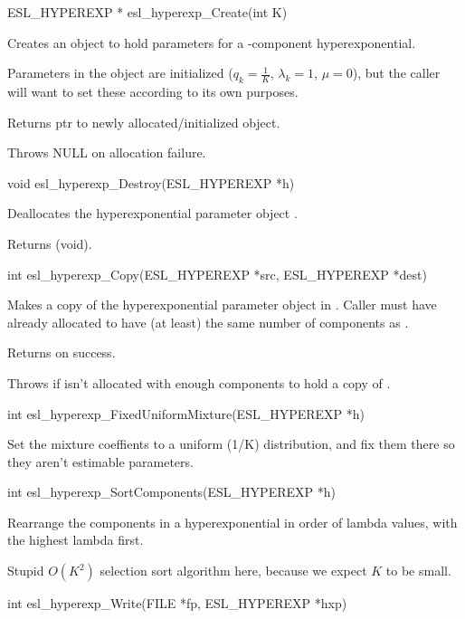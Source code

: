 \begin{sreapi}
\hypertarget{func:esl_hyperexp_Create()}
{\item[ESL\_HYPEREXP * esl\_hyperexp\_Create(int K)]}

Creates an object to hold parameters for a -component
hyperexponential. 

Parameters in the object are initialized 
($q_k = \frac{1}{K}$, $\lambda_k = 1$, $\mu = 0$), but
the caller will want to set these according to its own
purposes.

Returns ptr to newly allocated/initialized  object.

Throws NULL on allocation failure.


\hypertarget{func:esl_hyperexp_Destroy()}
{\item[void esl\_hyperexp\_Destroy(ESL\_HYPEREXP *h)]}

Deallocates the hyperexponential parameter object .

Returns (void).


\hypertarget{func:esl_hyperexp_Copy()}
{\item[int esl\_hyperexp\_Copy(ESL\_HYPEREXP *src, ESL\_HYPEREXP *dest)]}

Makes a copy of the hyperexponential parameter object 
in . Caller must have already allocated  to have
(at least) the same number of components as .

Returns  on success.

Throws  if  isn't allocated with enough
components to hold a copy of .


\hypertarget{func:esl_hyperexp_FixedUniformMixture()}
{\item[int esl\_hyperexp\_FixedUniformMixture(ESL\_HYPEREXP *h)]}

Set the mixture coeffients to a uniform (1/K) distribution,
and fix them there so they aren't estimable parameters.


\hypertarget{func:esl_hyperexp_SortComponents()}
{\item[int esl\_hyperexp\_SortComponents(ESL\_HYPEREXP *h)]}

Rearrange the components in a hyperexponential in
order of lambda values, with the highest lambda first.

Stupid $O(K^2)$ selection sort algorithm here, because we
expect $K$ to be small.


\hypertarget{func:esl_hyperexp_Write()}
{\item[int esl\_hyperexp\_Write(FILE *fp, ESL\_HYPEREXP *hxp)]}


\end{sreapi}
